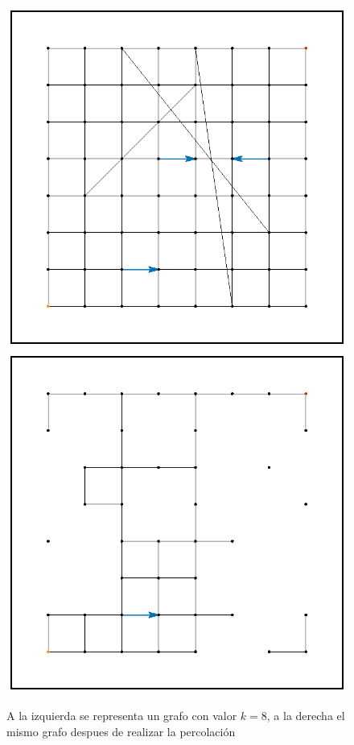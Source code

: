 \documentclass[12pt,letterpaper]{article}
\begin{document}
\begin{figure}[htbp]
\centering
\includegraphics[scale=0.5]{NoPercola}
\includegraphics[scale=0.5]{PercolaNodo}
\caption{A la izquierda se representa un grafo con valor $k=8$, a la derecha el mismo grafo despues de realizar la percolación}
\end{figure}
\end{document}

